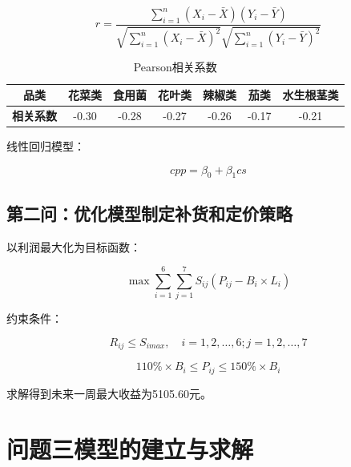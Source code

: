 \documentclass[a4paper,12pt]{article}
\begin{document}
	\begin{equation}
		r = \frac{\sum_{i=1}^{n}(X_i-\bar{X})(Y_i-\bar{Y})}{\sqrt{\sum_{i=1}^{n}(X_i-\bar{X})^2}\sqrt{\sum_{i=1}^{n}(Y_i-\bar{Y})^2}}
		\label{eq:pearson}
	\end{equation}
	
	\begin{table}[H]
		\centering
		\caption{Pearson相关系数}
		\begin{tabular}{c|c|c|c|c|c|c}
			\hline
			\textbf{品类} & 花菜类 & 食用菌 & 花叶类 & 辣椒类 & 茄类 & 水生根茎类 \\
			\hline
			\textbf{相关系数} & -0.30 & -0.28 & -0.27 & -0.26 & -0.17 & -0.21 \\
			\hline
		\end{tabular}
	\end{table}
	
	线性回归模型：
	
	\begin{equation}
		cpp = \beta_0 + \beta_1 cs
		\label{eq:regression}
	\end{equation}
	
	\subsection{第二问：优化模型制定补货和定价策略}
	
	以利润最大化为目标函数：
	
	\begin{equation}
		\max \sum_{i=1}^{6}\sum_{j=1}^{7} S_{ij}(P_{ij} - B_i \times L_i)
		\label{eq:objective}
	\end{equation}
	
	约束条件：
	
	\begin{equation}
		R_{ij} \leq S_{imax}, \quad i=1,2,\dots,6; j=1,2,\dots,7
		\label{eq:constraint1}
	\end{equation}
	
	\begin{equation}
		110\% \times B_i \leq P_{ij} \leq 150\% \times B_i
		\label{eq:constraint2}
	\end{equation}
	
	求解得到未来一周最大收益为5105.60元。
	
	\newpage
	
	\section{问题三模型的建立与求解}
	
\end{document}
